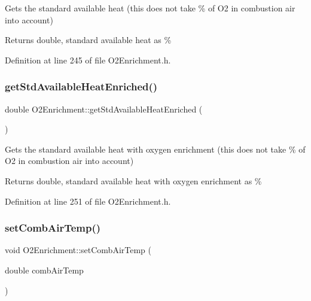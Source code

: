 Gets the standard available heat (this does not take \% of O2 in combustion air into account) \begin{DoxyReturn}{Returns}
double, standard available heat as \% 
\end{DoxyReturn}


Definition at line 245 of file O2\+Enrichment.\+h.

\mbox{\label{class_o2_enrichment_a24fd19f2aca20c7ba83061b832323ad6}} 
\subsubsection{\texorpdfstring{get\+Std\+Available\+Heat\+Enriched()}{getStdAvailableHeatEnriched()}}
{\footnotesize\ttfamily double O2\+Enrichment\+::get\+Std\+Available\+Heat\+Enriched (\begin{DoxyParamCaption}{ }\end{DoxyParamCaption})\hspace{0.3cm}{\ttfamily [inline]}}

Gets the standard available heat with oxygen enrichment (this does not take \% of O2 in combustion air into account) \begin{DoxyReturn}{Returns}
double, standard available heat with oxygen enrichment as \% 
\end{DoxyReturn}


Definition at line 251 of file O2\+Enrichment.\+h.

\mbox{\label{class_o2_enrichment_a70636d71deb4db00ddf761b0dffa3f36}} 
\subsubsection{\texorpdfstring{set\+Comb\+Air\+Temp()}{setCombAirTemp()}}
{\footnotesize\ttfamily void O2\+Enrichment\+::set\+Comb\+Air\+Temp (\begin{DoxyParamCaption}\item[{double}]{comb\+Air\+Temp }\end{DoxyParamCaption})\hspace{0.3cm}{\ttfamily [inline]}}


